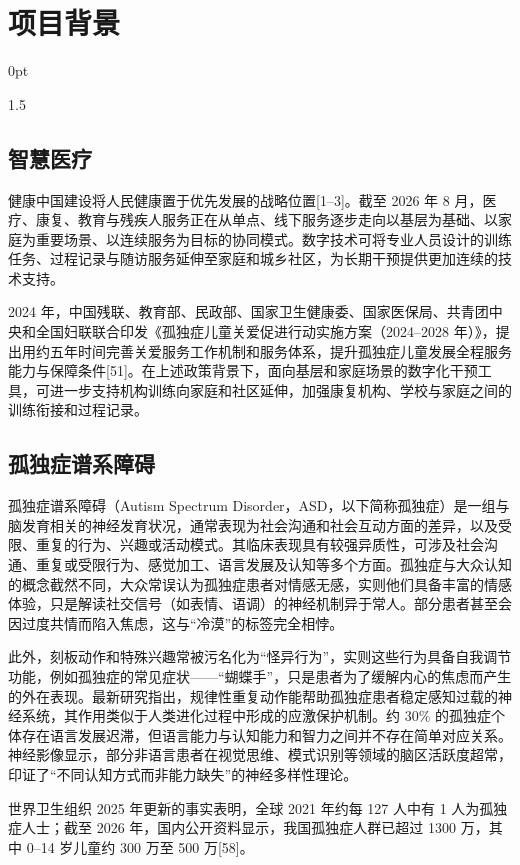 \documentclass[zihao=-4]{ctexart}
\newcommand{\setParDis}{\setlength {\parskip} {0pt} }
\begin{document}
\section{项目背景}
\setParDis %
\begin{spacing}{1.5}

\subsection{智慧医疗}

健康中国建设将人民健康置于优先发展的战略位置[1--3]。截至 2026 年 8 月，医疗、康复、教育与残疾人服务正在从单点、线下服务逐步走向以基层为基础、以家庭为重要场景、以连续服务为目标的协同模式。数字技术可将专业人员设计的训练任务、过程记录与随访服务延伸至家庭和城乡社区，为长期干预提供更加连续的技术支持。

2024 年，中国残联、教育部、民政部、国家卫生健康委、国家医保局、共青团中央和全国妇联联合印发《孤独症儿童关爱促进行动实施方案（2024--2028 年）》，提出用约五年时间完善关爱服务工作机制和服务体系，提升孤独症儿童发展全程服务能力与保障条件[51]。在上述政策背景下，面向基层和家庭场景的数字化干预工具，可进一步支持机构训练向家庭和社区延伸，加强康复机构、学校与家庭之间的训练衔接和过程记录。

\subsection{孤独症谱系障碍}

孤独症谱系障碍（Autism Spectrum Disorder，ASD，以下简称孤独症）是一组与脑发育相关的神经发育状况，通常表现为社会沟通和社会互动方面的差异，以及受限、重复的行为、兴趣或活动模式。其临床表现具有较强异质性，可涉及社会沟通、重复或受限行为、感觉加工、语言发展及认知等多个方面。孤独症与大众认知的概念截然不同，大众常误认为孤独症患者对情感无感，实则他们具备丰富的情感体验，只是解读社交信号（如表情、语调）的神经机制异于常人。部分患者甚至会因过度共情而陷入焦虑，这与“冷漠”的标签完全相悖。

此外，刻板动作和特殊兴趣常被污名化为“怪异行为”，实则这些行为具备自我调节功能，例如孤独症的常见症状——“蝴蝶手”，只是患者为了缓解内心的焦虑而产生的外在表现。最新研究指出，规律性重复动作能帮助孤独症患者稳定感知过载的神经系统，其作用类似于人类进化过程中形成的应激保护机制。约 30\% 的孤独症个体存在语言发展迟滞，但语言能力与认知能力和智力之间并不存在简单对应关系。神经影像显示，部分非语言患者在视觉思维、模式识别等领域的脑区活跃度超常，印证了“不同认知方式而非能力缺失”的神经多样性理论。

世界卫生组织 2025 年更新的事实表明，全球 2021 年约每 127 人中有 1 人为孤独症人士；截至 2026 年，国内公开资料显示，我国孤独症人群已超过 1300 万，其中 0--14 岁儿童约 300 万至 500 万[58]。


\end{spacing}
\end{document}
